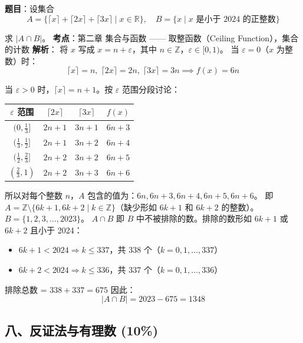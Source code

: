 \documentclass[10pt,a4paper,openany]{ctexbook}
\theoremstyle{definition}
\theoremstyle{remark}
\begin{document}
\textbf{题目}：设集合
\[
A = \{\lceil x \rceil + \lceil 2x \rceil + \lceil 3x \rceil \mid x \in \mathbb{R}\}, \quad
B = \{x \mid x\text{ 是小于 2024 的正整数}\}
\]

求 $|A \cap B|$。
\textbf{考点}：第二章 集合与函数 —— 取整函数（Ceiling Function），集合的计数
\textbf{解析}：
将 $x$ 写成 $x = n + \varepsilon$，其中 $n \in \mathbb{Z}$，$\varepsilon \in [0, 1)$。
当 $\varepsilon = 0$（$x$ 为整数）时：
\[
\lceil x \rceil = n,\; \lceil 2x \rceil = 2n,\; \lceil 3x \rceil = 3n \implies f(x) = 6n
\]

当 $\varepsilon > 0$ 时，$\lceil x \rceil = n + 1$。按 $\varepsilon$ 范围分段讨论：
\begin{center}
\begin{tabular}{cccc}
\hline
$\varepsilon$ 范围 & $\lceil 2x \rceil$ & $\lceil 3x \rceil$ & $f(x)$ \\ \hline
$(0, \frac{1}{3}]$ & $2n + 1$ & $3n + 1$ & $6n + 3$ \\
$(\frac{1}{3}, \frac{1}{2}]$ & $2n + 1$ & $3n + 2$ & $6n + 4$ \\
$(\frac{1}{2}, \frac{2}{3}]$ & $2n + 2$ & $3n + 2$ & $6n + 5$ \\
$(\frac{2}{3}, 1)$ & $2n + 2$ & $3n + 3$ & $6n + 6$ \\
\hline
\end{tabular}

\end{center}

所以对每个整数 $n$，$A$ 包含的值为：$6n, 6n+3, 6n+4, 6n+5, 6n+6$。
即 $A = \mathbb{Z} \setminus \{6k+1, 6k+2 \mid k \in \mathbb{Z}\}$（缺少形如 $6k+1$ 和 $6k+2$ 的整数）。
$B = \{1, 2, 3, \ldots, 2023\}$。
$A \cap B$ 即 $B$ 中不被排除的数。排除的数形如 $6k+1$ 或 $6k+2$ 且小于 2024：
\begin{itemize}
\item $6k+1 < 2024 \Rightarrow k \le 337$，共 338 个（$k = 0, 1, \ldots, 337$）
\item $6k+2 < 2024 \Rightarrow k \le 336$，共 337 个（$k = 0, 1, \ldots, 336$）

\end{itemize}

排除总数 = $338 + 337 = 675$
因此：
\[
|A \cap B| = 2023 - 675 = 1348
\]

\vspace{-2pt}

\subsection{八、反证法与有理数 (10\%)}
\end{document}
